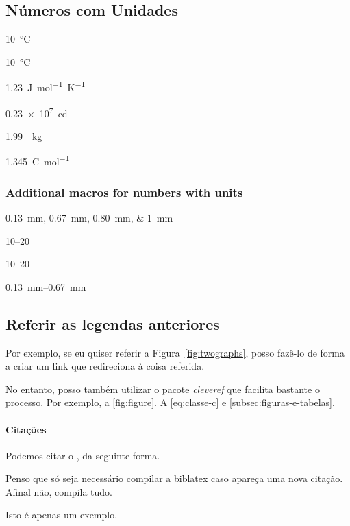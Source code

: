     \subsection*{Números com Unidades}

    \qty{10}{\celsius} \par
    \qty{10}{\degreeCelsius} \par
    \qty{1.23}{J.mol^{-1}.K^{-1}} \par
    \qty{.23e7}{\candela} \par
    \qty[per-mode = symbol]{1.99}{\per\kilogram} \par
    \qty[per-mode = fraction]{1,345}{\coulomb\per\mole}

    \pagebreak

    \subsubsection*{Additional macros for numbers with units}

    \qtylist{0.13;0.67;0.80;1}{\milli\metre}\par
     \par
     \par
    \numrange{10}{20} \par
    \numrange[range-phrase=--]{10}{20} \par
    \qtyrange{0.13}{0.67}{\milli\metre}

    \subsection{Referir as legendas anteriores}\label{subsec:reference}

    Por exemplo, se eu quiser referir a Figura~\ref{fig:twographs}, posso fazê-lo de forma a criar um link que redireciona à coisa referida.

    No entanto, posso também utilizar o pacote \emph{cleveref} que facilita bastante o processo.
    Por exemplo, a \cref{fig:figure}.
    A \cref{eq:classe-c} e \cref{subsec:figuras-e-tabelas}.

\paragraph{Citações} Podemos citar o \textcite{einstein}, da seguinte forma.

Penso que só seja necessário compilar a biblatex caso apareça uma nova citação.
Afinal não, compila tudo.

Isto é apenas um exemplo.